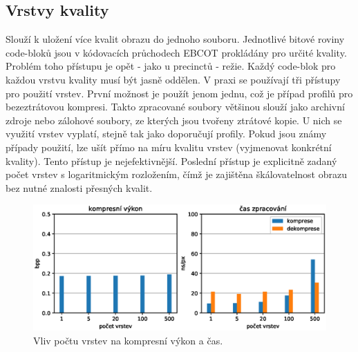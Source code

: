 \clearpage




%
%
\newpage
\subsection*{Vrstvy kvality}
Slouží k uložení více kvalit obrazu do jednoho souboru. Jednotlivé bitové roviny code-bloků jsou v kódovacích průchodech EBCOT prokládány pro určité kvality. Problém toho přístupu je opět - jako u precinctů - režie. Každý code-blok pro každou vrstvu kvality musí být jasně oddělen. V praxi se používají tři přístupy pro použití vrstev. První možnost je použít jenom jednu, což je případ profilů pro bezeztrátovou kompresi. Takto zpracované soubory většinou slouží jako archivní zdroje nebo zálohové soubory, ze kterých jsou tvořeny ztrátové kopie. U nich se využití vrstev vyplatí, stejně tak jako doporučují profily. Pokud jsou známy případy použití, lze ušít přímo na míru kvalitu vrstev (vyjmenovat konkrétní kvality). Tento přístup je nejefektivnější. Poslední přístup je explicitně zadaný počet vrstev s logaritmickým rozložením, čímž je zajištěna škálovatelnost obrazu bez nutné znalosti přesných kvalit.

\begin{figure}[hbt!]
  \centering
  \hspace*{-0.75cm}
  \includegraphics[width=16cm]{obrazky-figures/layers/fotky_layers.eps}
  \caption{Vliv počtu vrstev na kompresní výkon a čas.}
\end{figure}

